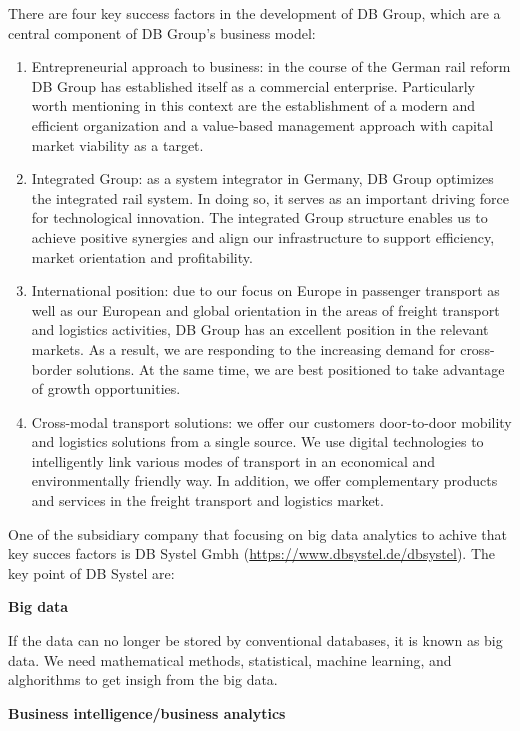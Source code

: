 \documentclass[]{book}
\begin{document}
There are four key success factors in the development of DB Group, which
are a central component of DB Group's business model:

\begin{enumerate}
\def\labelenumi{\arabic{enumi}.}
\item
  Entrepreneurial approach to business: in the course of the German rail
  reform DB Group has established itself as a commercial enterprise.
  Particularly worth mentioning in this context are the establishment of
  a modern and efficient organization and a value-based management
  approach with capital market viability as a target.
\item
  Integrated Group: as a system integrator in Germany, DB Group
  optimizes the integrated rail system. In doing so, it serves as an
  important driving force for technological innovation. The integrated
  Group structure enables us to achieve positive synergies and align our
  infrastructure to support efficiency, market orientation and
  profitability.
\item
  International position: due to our focus on Europe in passenger
  transport as well as our European and global orientation in the areas
  of freight transport and logistics activities, DB Group has an
  excellent position in the relevant markets. As a result, we are
  responding to the increasing demand for cross-border solutions. At the
  same time, we are best positioned to take advantage of growth
  opportunities.
\item
  Cross-modal transport solutions: we offer our customers door-to-door
  mobility and logistics solutions from a single source. We use digital
  technologies to intelligently link various modes of transport in an
  economical and environmentally friendly way. In addition, we offer
  complementary products and services in the freight transport and
  logistics market.
\end{enumerate}

One of the subsidiary company that focusing on big data analytics to
achive that key succes factors is DB Systel Gmbh
(\url{https://www.dbsystel.de/dbsystel}). The key point of DB Systel
are:

\textbf{Big data}

If the data can no longer be stored by conventional databases, it is
known as big data. We need mathematical methods, statistical, machine
learning, and alghorithms to get insigh from the big data.

\textbf{Business intelligence/business analytics}
\end{document}
